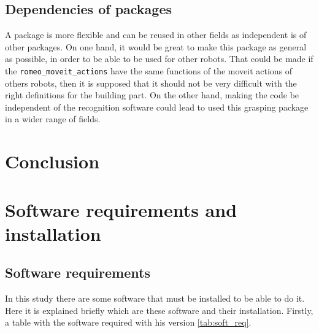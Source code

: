 \documentclass[12pt,a4paper,final,twoside,openright]{report}
\renewcommand{\thefigure}{\arabic{chapter}.\arabic{figure}}
\renewcommand{\thetable}{\arabic{chapter}.\arabic{table}}
\renewcommand{\theequation}{\arabic{chapter}.\arabic{equation}}
\renewcommand{\thefootnote}{\arabic{footnote}}
\begin{document}
\section{Dependencies of packages}

A package is more flexible and can be reused in other fields as independent is of other packages. On one hand, it would be great to make this package as general as possible, in order to be able to be used for other robots. That could be made if the \texttt{romeo\_moveit\_actions} have the same functions of the moveit actions of others robots, then it is supposed that it should not be very difficult with the right definitions for the building part. On the other hand, making the code be independent of the recognition software could lead to used this grasping package in a wider range of fields.


\chapter{Conclusion}
\label{cha:conclusions}


\label{cha:references}

\appendix
\clearpage %
\addappheadtotoc
\appendixpage

\renewcommand{\thefigure}{\thechapter.\arabic{figure}}
\renewcommand{\thetable}{\thechapter.\arabic{table}}
\renewcommand{\theequation}{\thechapter.\arabic{equation}}
\renewcommand{\thefootnote}{\arabic{footnote}}

%
\chapter{Software requirements and installation}
\section{Software requirements}

In this study there are some software that must be installed to be able to do it. Here it is explained briefly which are these software and their installation. Firstly, a table with the software required with his version \ref{tab:soft_req}.
\end{document}
